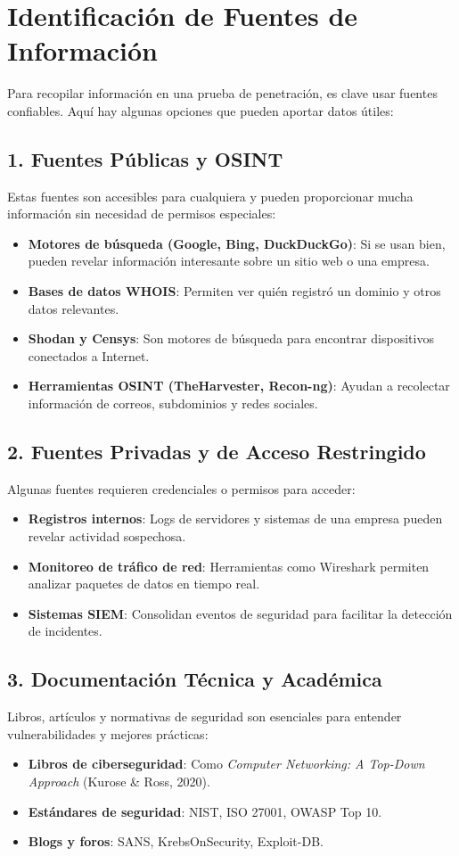 \section{Identificación de Fuentes de Información}

Para recopilar información en una prueba de penetración, es clave usar fuentes confiables. Aquí hay algunas opciones que pueden aportar datos útiles:

\subsection{1. Fuentes Públicas y OSINT}
Estas fuentes son accesibles para cualquiera y pueden proporcionar mucha información sin necesidad de permisos especiales:
\begin{itemize}
    \item \textbf{Motores de búsqueda (Google, Bing, DuckDuckGo)}: Si se usan bien, pueden revelar información interesante sobre un sitio web o una empresa.
    \item \textbf{Bases de datos WHOIS}: Permiten ver quién registró un dominio y otros datos relevantes.
    \item \textbf{Shodan y Censys}: Son motores de búsqueda para encontrar dispositivos conectados a Internet.
    \item \textbf{Herramientas OSINT (TheHarvester, Recon-ng)}: Ayudan a recolectar información de correos, subdominios y redes sociales.
\end{itemize}

\subsection{2. Fuentes Privadas y de Acceso Restringido}
Algunas fuentes requieren credenciales o permisos para acceder:
\begin{itemize}
    \item \textbf{Registros internos}: Logs de servidores y sistemas de una empresa pueden revelar actividad sospechosa.
    \item \textbf{Monitoreo de tráfico de red}: Herramientas como Wireshark permiten analizar paquetes de datos en tiempo real.
    \item \textbf{Sistemas SIEM}: Consolidan eventos de seguridad para facilitar la detección de incidentes.
\end{itemize}

\subsection{3. Documentación Técnica y Académica}
Libros, artículos y normativas de seguridad son esenciales para entender vulnerabilidades y mejores prácticas:
\begin{itemize}
    \item \textbf{Libros de ciberseguridad}: Como \textit{Computer Networking: A Top-Down Approach} (Kurose \& Ross, 2020).
    \item \textbf{Estándares de seguridad}: NIST, ISO 27001, OWASP Top 10.
    \item \textbf{Blogs y foros}: SANS, KrebsOnSecurity, Exploit-DB.
\end{itemize}


